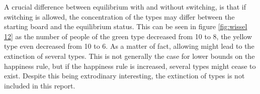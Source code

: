 A crucial difference between equilibrium with and without switching, is that if switching is allowed, the concentration of the types may differ between the starting board and the equilibrium status. 
This can be seen in figure \ref{fig:wissel 12} as the number of people of the green type decreased from 10 to 8, the yellow type even decreased from 10 to 6. 
As a matter of fact, allowing might lead to the extinction of several types. 
This is not generally the case for lower bounds on the happiness rule, but if the happiness rule is increased, several types might cease to exist. Despite this being extrodinary interesting, the extinction of types is not included in this report.